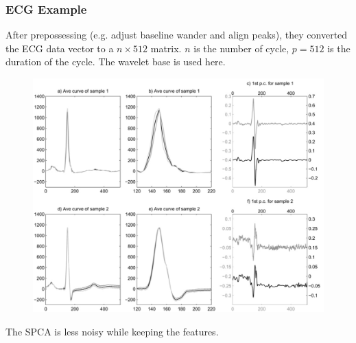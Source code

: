 \documentclass{beamer}
\begin{document}
	\begin{frame}
		\frametitle{ECG Example}
		After prepossessing (e.g. adjust baseline wander and align peaks),  they converted the ECG data vector to a $n \times 512$ matrix. $n$ is the number of cycle, $p=512$ is the duration of the cycle. The wavelet base is used here.
		\begin{figure}
			\includegraphics[width=0.6\linewidth]{image014.png}
		\end{figure}
		The SPCA is less noisy while keeping the features.
	\end{frame}

	
	
	
	
	
	
	
\end{document}
